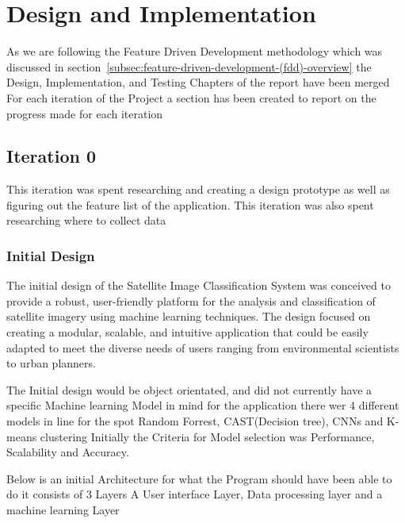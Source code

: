 \chapter{Design and Implementation}\label{ch:design-and-implementation}

As we are following the Feature Driven Development methodology
which was discussed in section~\ref{subsec:feature-driven-development-(fdd)-overview} the Design,
Implementation, and Testing Chapters of the report have been merged
For each iteration of the Project a section has been created to report on the progress made for each iteration

\section{ Iteration 0}\label{sec:iteration-0}

This iteration was spent researching and creating a design prototype as well as figuring out the feature list of the
application.
This iteration was also spent researching where to collect data

\subsection{Initial Design}\label{subsec:initial-design}

The initial design of the Satellite Image Classification System was conceived to provide a robust,
user-friendly platform
for the analysis and classification of satellite imagery using machine learning techniques.
The design focused on creating a modular, scalable,
and intuitive application that could be easily adapted to meet the diverse needs
of users ranging from environmental scientists to urban planners.

The Initial design would be object orientated, and did not currently have a specific Machine learning Model in mind for
the application there wer 4 different models in line for the spot Random Forrest, CAST(Decision tree), CNNs and K-means clustering
Initially the Criteria for Model selection was Performance, Scalability and Accuracy.

Below is an initial Architecture for what
the Program should have been able to do it consists of 3 Layers A User interface Layer,
Data processing layer and a machine learning Layer

